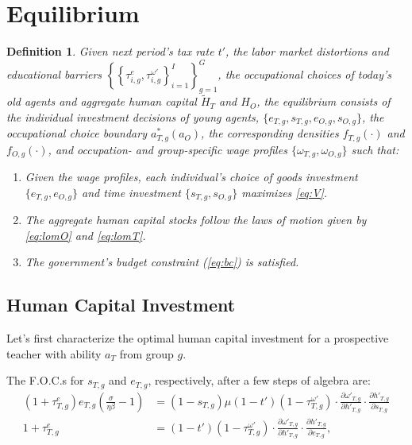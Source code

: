 \documentclass[onehalfspacing,11pt]{article}
\newtheorem{df}{Definition}
\begin{document}
	\section{Equilibrium}\label{sec:equilibrium}
	\begin{df}
		Given next period's tax rate $t'$, the labor market distortions and educational barriers $\left\{ \left\{ \tau_{i,g}^e,\tau_{i,g}^{\omega '} \right\}_{i=1}^I \right\}_{g=1}^G$, the occupational choices of today's old agents and aggregate human capital $\widetilde{H}_{T}$ and ${H}_{O}$, the equilibrium consists of the individual investment decisions of young agents, $\{e_{T,g}, s_{T,g}, e_{O,g}, s_{O,g}\}$, the occupational choice boundary $a^*_{T,g}(a_O)$, the corresponding densities $f_{T,g}\left(\cdot\right)$ and $f_{O,g}\left(\cdot\right)$, and occupation- and group-specific wage profiles $\{\omega_{T,g}, \omega_{O,g}\}$ such that:
		\begin{enumerate}
			\item Given the wage profiles, each individual's choice of goods investment $\{e_{T,g}, e_{O,g}\}$ and time investment $\{s_{T,g}, s_{O,g}\}$ maximizes \eqref{eq:V}.
			\item The aggregate human capital stocks follow the laws of motion given by \eqref{eq:lomO} and \eqref{eq:lomT}.
			\item The government's budget constraint (\ref{eq:bc}) is satisfied.
		\end{enumerate}
	\end{df}
	
	\subsection{Human Capital Investment}
	Let's first characterize the optimal human capital investment for a prospective teacher with ability $a_T$ from group $g$.%
	
	The F.O.C.s for $s_{T,g}$ and $e_{T,g}$, respectively, after a few steps of algebra are:
	\begin{align}
		\label{eq:foc-e}
		(1+\tau^e_{T,g}) e_{T,g} \left( \tfrac{\sigma}{\eta\beta }-1 \right) & = \left(1-s_{T,g}\right) \mu(1-t')(1-\tau^{\omega '}_{T,g}) \cdot \tfrac{\partial \omega'_{T,g}}{\partial h'_{T,g}} \cdot \tfrac{\partial h'_{T,g}}{\partial s_{T,g}}\\
		\label{eq:foc-s}
		1+\tau^e_{T,g} & = (1-t')(1-\tau^{\omega '}_{T,g})\cdot \tfrac{\partial \omega'_{T,g}}{\partial h'_{T,g}}\cdot \tfrac{\partial h'_{T,g}}{\partial e_{T,g}},
	\end{align}
	
\end{document}
